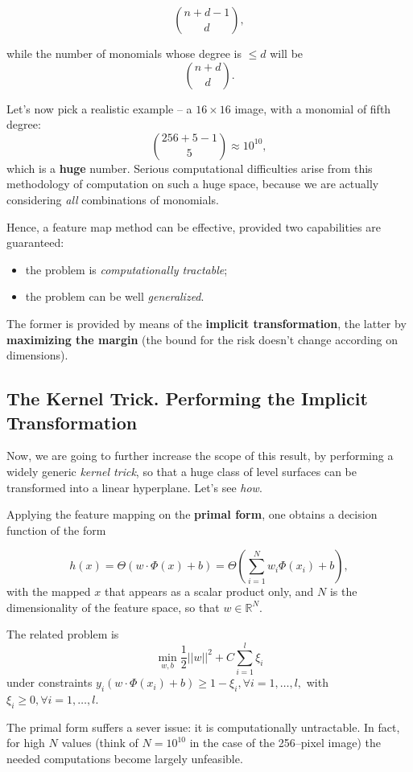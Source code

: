 \documentclass[10pt]{report}
\begin{document}
$$ \binom{n + d - 1}{d}, $$

while the number of monomials whose degree is \(\leq d\) will be  $$ \binom{n+d}{d}. $$

Let's now pick a realistic example -- a \(16 \times 16\) image, with a monomial of
fifth degree:
$$\binom{256 + 5 - 1}{5} \approx 10^{10},$$ which is a \textbf{huge} number. Serious
computational difficulties arise from this methodology of computation on such a
huge space, because we are actually considering \emph{all} combinations of monomials.

Hence, a feature map method can be effective, provided two capabilities are guaranteed:

\begin{itemize}
\item the problem is \emph{computationally tractable};
\item the problem can be well \emph{generalized}.
\end{itemize}

The former is provided by means of the \textbf{implicit transformation}, the latter by
\textbf{maximizing the margin} (the bound for the risk doesn't change according on
dimensions).

\subsection{The Kernel Trick. Performing the Implicit Transformation}
\label{sec:org978d2dc}

Now, we are going to further increase the scope of this result, by performing a
widely generic \emph{kernel trick}, so that a huge class of level surfaces can be
transformed into a linear hyperplane. Let's see \emph{how}.

Applying the feature mapping on the \textbf{primal form}, one obtains a decision function
of the form

$$h(x) = \Theta(w \cdot \Phi(x) + b) = \Theta\left(\sum_{i=1}^N w_i\Phi(x_i) +
b\right),$$ with the mapped \(x\) that appears as a scalar product only, and \(N\) is the
dimensionality of the feature space, so that \(w \in \mathbb{R}^N\).

The related problem is \[\min_{w, b} \frac 1 2 ||w||^2 + C\sum_{i=1}^l \xi_i\]
under constraints \(y_i(w \cdot \Phi(x_i) + b) \geq 1 - \xi_i, \forall
i=1,\dots,l,\) with \(\xi_i \geq 0, \forall i=1,\dots,l\).

The primal form suffers a sever issue: it is computationally untractable. In fact,
for high \(N\) values (think of \(N=10^{10}\) in the case of the 256--pixel image) the
needed computations become largely unfeasible.
\end{document}
